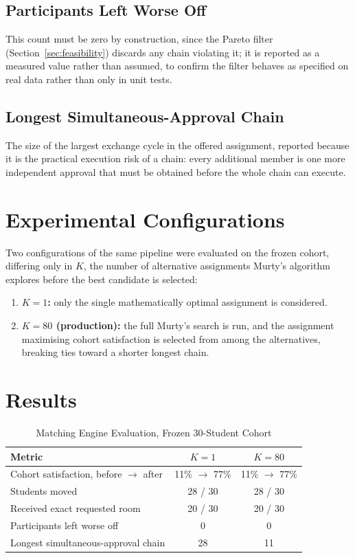 \documentclass[11pt,a4paper]{report}
\begin{document}
\subsection{Participants Left Worse Off}

This count must be zero by construction, since the Pareto filter
(Section~\ref{sec:feasibility}) discards any chain violating it; it is
reported as a measured value rather than assumed, to confirm the
filter behaves as specified on real data rather than only in unit
tests.

\subsection{Longest Simultaneous-Approval Chain}

The size of the largest exchange cycle in the offered assignment,
reported because it is the practical execution risk of a chain: every
additional member is one more independent approval that must be
obtained before the whole chain can execute.

\section{Experimental Configurations}

Two configurations of the same pipeline were evaluated on the frozen
cohort, differing only in $K$, the number of alternative assignments
Murty's algorithm explores before the best candidate is selected:

\begin{enumerate}
    \item \textbf{$K = 1$:} only the single mathematically optimal
    assignment is considered.
    \item \textbf{$K = 80$ (production):} the full Murty's search is
    run, and the assignment maximising cohort satisfaction is
    selected from among the alternatives, breaking ties toward a
    shorter longest chain.
\end{enumerate}

\section{Results}

\begin{table}[H]
\centering
\begin{tabular}{lcc}
\toprule
\textbf{Metric} & \textbf{$K=1$} & \textbf{$K=80$} \\
\midrule
Cohort satisfaction, before $\to$ after & 11\% $\to$ 77\% & 11\% $\to$ 77\% \\
Students moved & 28 / 30 & 28 / 30 \\
Received exact requested room & 20 / 30 & 20 / 30 \\
Participants left worse off & 0 & 0 \\
Longest simultaneous-approval chain & 28 & 11 \\
\bottomrule
\end{tabular}
\caption{Matching Engine Evaluation, Frozen 30-Student Cohort}
\label{tab:evaluation}
\end{table}
\end{document}
